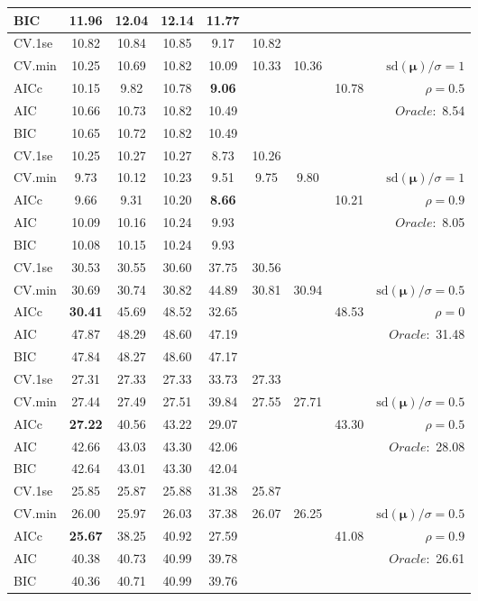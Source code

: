 \begin{table}
\begin{center}
\begin{tabular}{l*{7}{c}|r}
BIC & 11.96 & 12.04 & 12.14 & 11.77 & & & &  \\
 \hline 
CV.1se & 10.82 & 10.84 & 10.85 & 9.17 & 10.82 & & & \\
CV.min & 10.25 & 10.69 & 10.82 & 10.09 & 10.33 & 10.36 & & $\mathrm{sd}(\mathbf{\mu})/\sigma=1$ \\
AICc & 10.15 & 9.82 & 10.78 & {\bf 9.06} & & & 10.78 &  $\rho=0.5$ \\
AIC & 10.66 & 10.73 & 10.82 & 10.49 & & & &  \multirow{2}{*}{$Oracle: $ 8.54} \\
BIC & 10.65 & 10.72 & 10.82 & 10.49 & & & &  \\
 \hline 
CV.1se & 10.25 & 10.27 & 10.27 & 8.73 & 10.26 & & & \\
CV.min & 9.73 & 10.12 & 10.23 & 9.51 & 9.75 & 9.80 & & $\mathrm{sd}(\mathbf{\mu})/\sigma=1$ \\
AICc & 9.66 & 9.31 & 10.20 & {\bf 8.66} & & & 10.21 &  $\rho=0.9$ \\
AIC & 10.09 & 10.16 & 10.24 & 9.93 & & & &  \multirow{2}{*}{$Oracle: $ 8.05} \\
BIC & 10.08 & 10.15 & 10.24 & 9.93 & & & &  \\
 \hline 
CV.1se & 30.53 & 30.55 & 30.60 & 37.75 & 30.56 & & & \\
CV.min & 30.69 & 30.74 & 30.82 & 44.89 & 30.81 & 30.94 & & $\mathrm{sd}(\mathbf{\mu})/\sigma=0.5$ \\
AICc & {\bf 30.41} & 45.69 & 48.52 & 32.65 & & & 48.53 &  $\rho=0$ \\
AIC & 47.87 & 48.29 & 48.60 & 47.19 & & & &  \multirow{2}{*}{$Oracle: $ 31.48} \\
BIC & 47.84 & 48.27 & 48.60 & 47.17 & & & &  \\
 \hline 
CV.1se & 27.31 & 27.33 & 27.33 & 33.73 & 27.33 & & & \\
CV.min & 27.44 & 27.49 & 27.51 & 39.84 & 27.55 & 27.71 & & $\mathrm{sd}(\mathbf{\mu})/\sigma=0.5$ \\
AICc & {\bf 27.22} & 40.56 & 43.22 & 29.07 & & & 43.30 &  $\rho=0.5$ \\
AIC & 42.66 & 43.03 & 43.30 & 42.06 & & & &  \multirow{2}{*}{$Oracle: $ 28.08} \\
BIC & 42.64 & 43.01 & 43.30 & 42.04 & & & &  \\
 \hline 
CV.1se & 25.85 & 25.87 & 25.88 & 31.38 & 25.87 & & & \\
CV.min & 26.00 & 25.97 & 26.03 & 37.38 & 26.07 & 26.25 & & $\mathrm{sd}(\mathbf{\mu})/\sigma=0.5$ \\
AICc & {\bf 25.67} & 38.25 & 40.92 & 27.59 & & & 41.08 &  $\rho=0.9$ \\
AIC & 40.38 & 40.73 & 40.99 & 39.78 & & & &  \multirow{2}{*}{$Oracle: $ 26.61} \\
BIC & 40.36 & 40.71 & 40.99 & 39.76 & & & &  \\
 \hline 
\end{tabular}
\end{center}
\vspace{-1cm}
\end{table}





